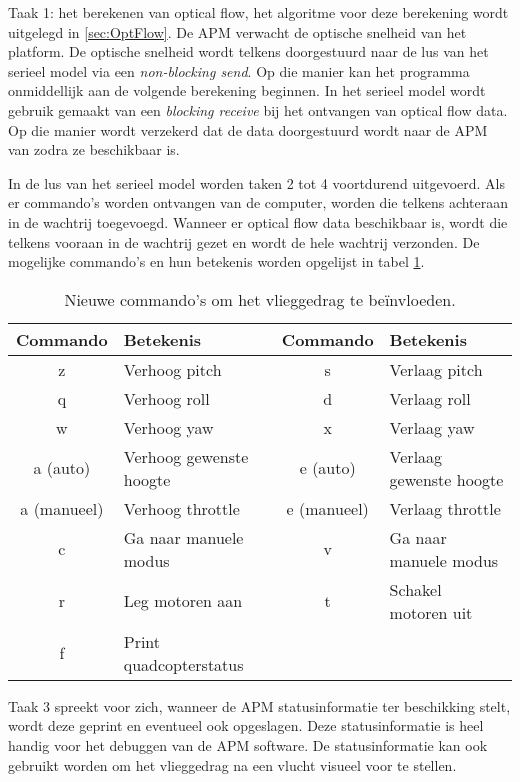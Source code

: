 \noindent Taak 1: het berekenen van optical flow, het algoritme voor deze berekening wordt uitgelegd in \ref{sec:OptFlow}. De APM verwacht de optische snelheid van het platform. De optische snelheid wordt telkens doorgestuurd naar de lus van het serieel model via een \textit{non-blocking send}. Op die manier kan het programma onmiddellijk aan de volgende berekening beginnen. In het serieel model wordt gebruik gemaakt van een \textit{blocking receive} bij het ontvangen van optical flow data. Op die manier wordt verzekerd dat de data doorgestuurd wordt naar de APM van zodra ze beschikbaar is.

\npar In de lus van het serieel model worden taken 2 tot 4 voortdurend uitgevoerd. Als er commando's worden ontvangen van de computer, worden die telkens achteraan in de wachtrij toegevoegd. Wanneer er optical flow data beschikbaar is, wordt die telkens vooraan in de wachtrij gezet en wordt de hele wachtrij verzonden. De mogelijke commando's en hun betekenis worden opgelijst in tabel \ref{table:oldcom}.

\begin{table}[h]
	\caption{Nieuwe commando's om het vlieggedrag te be\"invloeden.}\label{table:oldcom}
	\centering
	\begin{tabular}{cp{.3\linewidth}cp{.3\linewidth}}
		\cr
		\hline
		Commando & Betekenis & Commando & Betekenis \\
		\hline
		z & Verhoog pitch & s & Verlaag pitch\\
		q & Verhoog roll & d & Verlaag roll \\
		w & Verhoog yaw & x & Verlaag yaw \\
		a (auto) & Verhoog gewenste hoogte & e (auto) & Verlaag gewenste hoogte \\
		a (manueel) & Verhoog throttle & e (manueel) & Verlaag throttle\\
		c & Ga naar manuele modus & v & Ga naar manuele modus \\	
		r & Leg motoren aan & t & Schakel motoren uit \\	
		f & Print quadcopterstatus & & \\
		\hline				
	\end{tabular}
\end{table}

\npar Taak 3 spreekt voor zich, wanneer de APM statusinformatie ter beschikking stelt, wordt deze geprint en eventueel ook opgeslagen. Deze statusinformatie is heel handig voor het debuggen van de APM software. De statusinformatie kan ook gebruikt worden om het vlieggedrag na een vlucht visueel voor te stellen.


